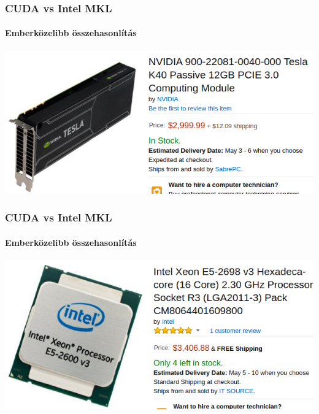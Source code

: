\documentclass[xetex]{beamer}
\begin{document}
  \begin{frame}
    \frametitle{CUDA vs Intel MKL}
    \framesubtitle{Emberközelibb összehasonlítás}
    \includegraphics[width=1.0\textwidth]{figures/tesla.png}
  \end{frame}
  \begin{frame}
    \frametitle{CUDA vs Intel MKL}
    \framesubtitle{Emberközelibb összehasonlítás}
    \includegraphics[width=1.0\textwidth]{figures/xeon.png}
  \end{frame}
\end{document}
